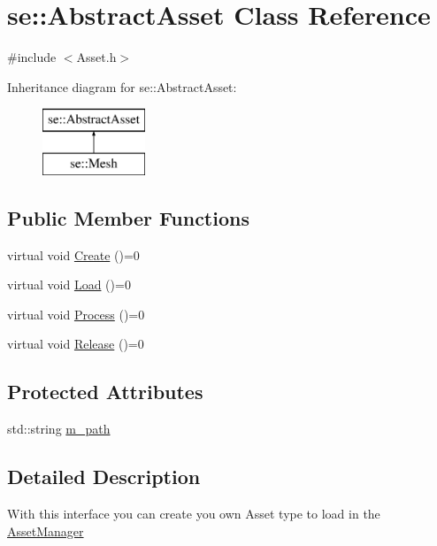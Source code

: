 \hypertarget{classse_1_1_abstract_asset}{}\section{se\+:\+:Abstract\+Asset Class Reference}
\label{classse_1_1_abstract_asset}


{\ttfamily \#include $<$Asset.\+h$>$}

Inheritance diagram for se\+:\+:Abstract\+Asset\+:\begin{figure}[H]
\begin{center}
\leavevmode
\includegraphics[height=2.000000cm]{classse_1_1_abstract_asset}
\end{center}
\end{figure}
\subsection*{Public Member Functions}
\begin{DoxyCompactItemize}
\item 
virtual void \mbox{\hyperlink{classse_1_1_abstract_asset_ae3f9fb8f5c26ac8ea511e8e21f5bd624}{Create}} ()=0
\item 
virtual void \mbox{\hyperlink{classse_1_1_abstract_asset_afb4dff418acf169d81b6ca5d8c1f6548}{Load}} ()=0
\item 
virtual void \mbox{\hyperlink{classse_1_1_abstract_asset_a1f2fdf75bbeaddec16dc4778063505b7}{Process}} ()=0
\item 
virtual void \mbox{\hyperlink{classse_1_1_abstract_asset_aea97e36f647efdb07a801b6fc468388d}{Release}} ()=0
\end{DoxyCompactItemize}
\subsection*{Protected Attributes}
\begin{DoxyCompactItemize}
\item 
std\+::string \mbox{\hyperlink{classse_1_1_abstract_asset_afa609af58ca8617ef9ab7f6de84e121f}{m\+\_\+path}}
\end{DoxyCompactItemize}


\subsection{Detailed Description}
With this interface you can create you own Asset type to load in the \mbox{\hyperlink{classse_1_1_asset_manager}{Asset\+Manager}} 

